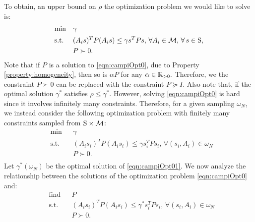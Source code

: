 To obtain, an upper bound on $\rho$ the optimization problem we would like to solve is:
\begin{equation}\label{eqn:campiOpt0}
\begin{aligned}
& \text{min} & & \gamma \\
& \text{s.t.} 
&  & (A_is)^TP(A_is) \leq \gamma s^TPs,\,\forall A_i \in \mathcal{M}, \,\forall\, s \in \text{S},\\
& && P \succ 0. \\
\end{aligned}
\end{equation}
Note that if $P$ is a solution to \eqref{eqn:campiOpt0}, due to Property \ref{property:homogeneity}, then so is $\alpha P$ for any $\alpha \in \mathbb{R}_{> 0}.$ Therefore, we the constraint $P \succ 0$ can be replaced with the constraint $P \succeq I$. Also note that, if the optimal solution $\gamma^*$ satisfies $\rho \leq \gamma^*$. However, solving \eqref{eqn:campiOpt0} is hard since it involves infinitely many constraints. Therefore, for a given sampling $\omega_N$, we instead consider the following optimization problem with finitely many constraints sampled from $\text{S} \times \mathcal{M}$: 
\begin{equation}\label{eqn:campiOpt01}
\begin{aligned}
& \text{min} & & \gamma \\
& \text{s.t.} 
&  & (A_is_i)^TP(A_is_i) \leq \gamma s_i^TPs_i,\,\forall (s_i,A_i) \in \omega_N \\
& && P \succ 0. \\
\end{aligned}
\end{equation}
Let $\gamma^*(\omega_N)$ be the optimal solution of \eqref{eqn:campiOpt01}. We now analyze the relationship between the solutions of the optimization problem \eqref{eqn:campiOpt0} and:
\begin{equation}\label{eqn:campiOpt02}
\begin{aligned}
& \text{find} & & P \\
& \text{s.t.} 
&  & (A_is_i)^TP(A_is_i) \leq \gamma^* s_i^TPs_i,\,\forall (s_i,A_i) \in \omega_N \\
& && P \succ 0. \\
\end{aligned}
\end{equation}
